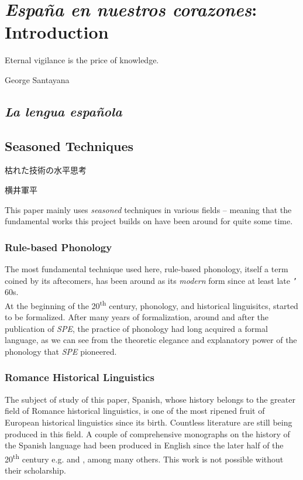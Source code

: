 \documentclass{report}[12pt]
\begin{document}
\pagebreak

\chapter{\emph{España en nuestros corazones}: \\ Introduction}

\epigraph{Eternal vigilance is the price of knowledge.}{George Santayana}

\section{\emph{La lengua española}}

\section{Seasoned Techniques}

\epigraph{枯れた技術の水平思考\footnotemark}{横井軍平}

This paper mainly uses \emph{seasoned} techniques in various fields -- meaning that the fundamental works this project builds on have been around for quite some time. 

\subsection{Rule-based Phonology}

The most fundamental technique used here, rule-based phonology, itself a term coined by its aftecomers, has been around as its \emph{modern} form since at least late \texttt{'}\kern-1pt 60s. \\
At the beginning of the 20\textsuperscript{th} century, phonology, and historical linguisitcs, started to be formalized. After many years of formalization, around and after the publication of \emph{SPE}, the practice of phonology had long acquired a formal language, as we can see from the theoretic elegance and explanatory power of the phonology that \emph{SPE} pioneered.

\subsection{Romance Historical Linguistics}

The subject of study of this paper, Spanish, whose history belongs to the greater field of Romance historical linguistics, is one of the most ripened fruit of European historical linguistics since its birth. Countless literature are still being produced in this field. A couple of comprehensive monographs on the history of the Spanish language had been produced in English since the later half of the 20\textsuperscript{th} century e.g. \cite{penny_spanish} and \cite{lloyd_spanish}, among many others. This work is not possible without their scholarship.
\end{document}
